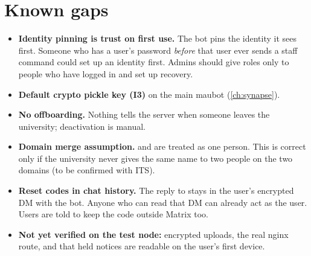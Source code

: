 \section{Known gaps}

\begin{itemize}
  \item \textbf{Identity pinning is trust on first use.} The bot pins the identity it sees
        first. Someone who has a user's password \emph{before} that user ever sends a staff
        command could set up an identity first. Admins should give roles only to people who
        have logged in and set up recovery.
  \item \textbf{Default crypto pickle key (I3)} on the main maubot (\autoref{ch:synapse}).
  \item \textbf{No offboarding.} Nothing tells the server when someone leaves the university;
        deactivation is manual.
  \item \textbf{Domain merge assumption.}  and  are
        treated as one person. This is correct only if the university never gives the same
        name to two people on the two domains (to be confirmed with ITS).
  \item \textbf{Reset codes in chat history.} The reply to  stays in the
        user's encrypted DM with the bot. Anyone who can read that DM can already act as the
        user. Users are told to keep the code outside Matrix too.
  \item \textbf{Not yet verified on the test node:} encrypted uploads, the real nginx route,
        and that held notices are readable on the user's first device.
\end{itemize}
